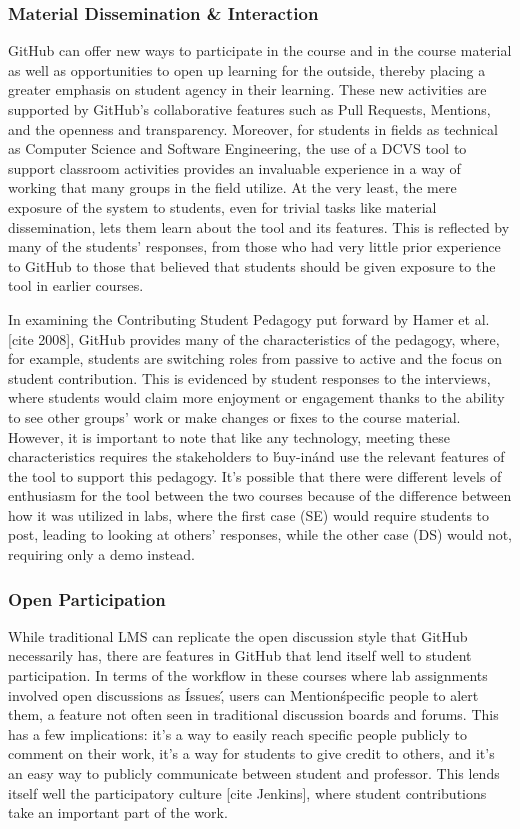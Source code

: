 \subsubsection{Material Dissemination & Interaction}
GitHub can offer new ways to participate in the course and in the course material as well as opportunities to open up learning for the outside, thereby placing a greater emphasis on student agency in their learning. These new activities are supported by GitHub's collaborative features such as Pull Requests, Mentions, and the openness and transparency. Moreover, for students in fields as technical as Computer Science and Software Engineering, the use of a DCVS tool to support classroom activities provides an invaluable experience in a way of working that many groups in the field utilize. At the very least, the mere exposure of the system to students, even for trivial tasks like material dissemination, lets them learn about the tool and its features. This is reflected by many of the students' responses, from those who had very little prior experience to GitHub to those that believed that students should be given exposure to the tool in earlier courses.

In examining the Contributing Student Pedagogy put forward by Hamer et al. [cite 2008], GitHub provides many of the characteristics of the pedagogy, where, for example, students are switching roles from passive to active and the focus on student contribution. %
This is evidenced by student responses to the interviews, where students would claim more enjoyment or engagement thanks to the ability to see other groups' work or make changes or fixes to the course material. However, it is important to note that like any technology, meeting these characteristics requires the stakeholders to \'buy-in\' and use the relevant features of the tool to support this pedagogy. It's possible that there were different levels of enthusiasm for the tool between the two courses because of the difference between how it was utilized in labs, where the first case (SE) would require students to post, leading to looking at others' responses, while the other case (DS) would not, requiring only a demo instead.

\subsubsection{Open Participation}
While traditional LMS can replicate the open discussion style that GitHub necessarily has, there are features in GitHub that lend itself well to student participation. In terms of the workflow in these courses where lab assignments involved open discussions as \'Issues\', users can \'Mention\' specific people to alert them, a feature not often seen in traditional discussion boards and forums. This has a few implications: it's a way to easily reach specific people publicly to comment on their work, it's a way for students to give credit to others, and it's an easy way to publicly communicate between student and professor. This lends itself well the participatory culture [cite Jenkins], where student contributions take an important part of the work.

